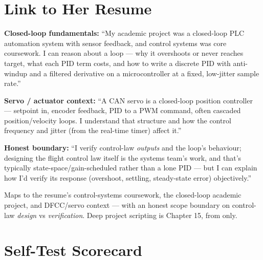 \section{Link to Her Resume}

\begin{resumelink}
\textbf{Closed-loop fundamentals:} ``My academic project was a closed-loop
PLC automation system with sensor feedback, and control systems was core
coursework. I can reason about a loop --- why it overshoots or never reaches
target, what each PID term costs, and how to write a discrete PID with
anti-windup and a filtered derivative on a microcontroller at a fixed,
low-jitter sample rate.''

\medskip
\textbf{Servo / actuator context:} ``A CAN servo is a closed-loop position
controller --- setpoint in, encoder feedback, PID to a PWM command, often
cascaded position/velocity loops. I understand that structure and how the
control frequency and jitter (from the real-time timer) affect it.''

\medskip
\textbf{Honest boundary:} ``I verify control-law \emph{outputs} and the loop's
behaviour; designing the flight control law itself is the systems team's work,
and that's typically state-space/gain-scheduled rather than a lone PID --- but I
can explain how I'd verify its response (overshoot, settling, steady-state
error) objectively.''

\medskip
\small Maps to the resume's control-systems coursework, the closed-loop
academic project, and DFCC/servo context --- with an honest scope boundary on
control-law \emph{design} vs \emph{verification}. Deep project scripting is
Chapter 15, from  only.
\end{resumelink}

\section{Self-Test Scorecard}

